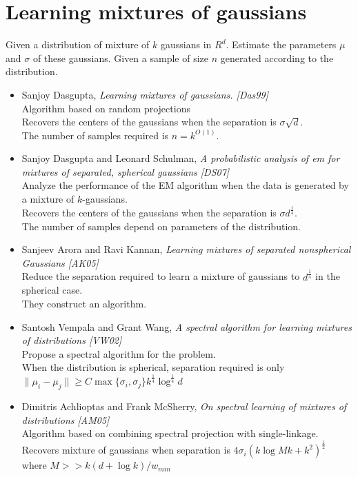 \documentclass[12pt]{article}
\begin{document}
\section{Learning mixtures of gaussians}

Given a distribution of mixture of $k$ gaussians in $R^d$. Estimate the parameters $\mu$ and $\sigma$ of these gaussians. Given a sample of size $n$ generated according to the distribution.

\begin{itemize}
	\item Sanjoy Dasgupta, {\em Learning mixtures of gaussians. [Das99]}\\
	Algorithm based on random projections\\
	Recovers the centers of the gaussians when the separation is $\sigma \sqrt d$.\\
	The number of samples required is $n = k^{O(1)}$.
	
	\item Sanjoy Dasgupta and Leonard Schulman, {\em A probabilistic analysis of em for mixtures of separated, spherical gaussians [DS07]} \\
	Analyze the performance of the EM algorithm when the data is generated by a mixture of $k$-gaussians.\\
	Recovers the centers of the gaussians when the separation is $\sigma d^{\frac{1}{4}}$.\\
	The number of samples depend on parameters of the distribution.
	
	\item Sanjeev Arora and Ravi Kannan, {\em Learning mixtures of separated nonspherical Gaussians [AK05]}\\
	Reduce the separation required to learn a mixture of gaussians to $d^{\frac{1}{4}}$ in the spherical case.\\
	They construct an algorithm.
	
	\item Santosh Vempala and Grant Wang, {\em A spectral algorithm for learning mixtures of distributions [VW02]}\\
	Propose a spectral algorithm for the problem.\\
	When the distribution is spherical, separation required is only $\|\mu_i - \mu_j\| \ge C \max \{\sigma_i, \sigma_j \} k^{\frac{1}{4}}\log^{\frac{1}{4}}d$
	
	\item Dimitris Achlioptas and Frank McSherry, {\em On spectral learning of mixtures of distributions [AM05]}\\
	Algorithm based on combining spectral projection with single-linkage.\\
	Recovers mixture of gaussians when separation is $4\sigma_i(k\log Mk + k^2)^{\frac{1}{2}}$ where $M >> k(d+ \log k)/w_{min}$
	

\end{itemize}
\end{document}
